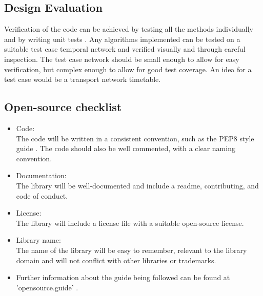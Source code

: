 \begin{design}
\subsection{Design Evaluation}
Verification of the code can be achieved by testing all the methods individually and by writing unit tests \cite{unittest}. Any algorithms implemented can be tested on a suitable test case temporal network and verified visually and through careful inspection. The test case network should be small enough to allow for easy verification, but complex enough to allow for good test coverage. An idea for a test case would be a transport network timetable.
\clearpage
\subsection{Open-source checklist}
\begin{itemize}
  \item Code:\\
  The code will be written in a consistent convention, such as the PEP8 style guide \cite{pep8}. The code should also be well commented, with a clear naming convention.
  \item Documentation:\\
  The library will be well-documented and include a readme, contributing, and code of conduct.
  \item License:\\
  The library will include a license file with a suitable open-source license.
  \item Library name:\\
  The name of the library will be easy to remember, relevant to the library domain and will not conflict with other libraries or trademarks.
  \item Further information about the guide being followed can be found at 'opensource.guide' \cite{open_source}.
\end{itemize}

\end{design}
